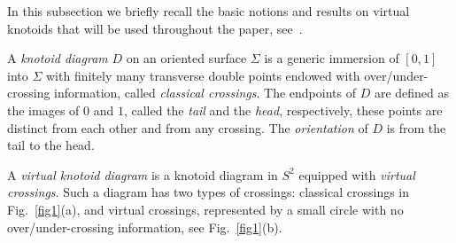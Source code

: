 \documentclass[12pt]{amsart}
\theoremstyle{noparens}
\numberwithin{equation}{section}
\numberwithin{equation}{section}
\begin{document}
In this subsection we briefly recall the basic notions and results on virtual knotoids that will be used throughout the paper, see~\cite{GK,Tur1}.

A \textit{knotoid diagram} $D$ on an oriented surface $\Sigma$ is a generic immersion of $[0,1]$ into $\Sigma$ with finitely many transverse double points endowed with over/under-crossing information, called \textit{classical crossings}. The endpoints of $D$ are defined as the images of $0$ and $1$, called the \textit{tail} and the \textit{head}, respectively, these points are distinct from each other and from any crossing. The \textit{orientation} of $D$ is from the tail to the head.

A \textit{virtual knotoid diagram} is a knotoid diagram in $S^2$ equipped with \textit{virtual crossings}. Such a diagram has two types of crossings: classical crossings in Fig.~\ref{fig1}(a), and virtual crossings, represented by a small circle with no over/under-crossing information, see Fig.~\ref{fig1}(b). 
\end{document}
